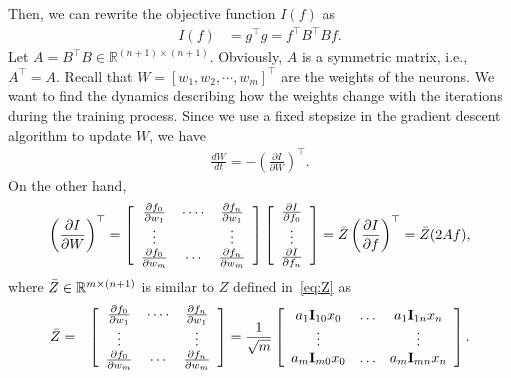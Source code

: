 \documentclass[letterpaper,12pt]{article}
\begin{document}
Then, we can rewrite the objective function $I(f)$ as 
\begin{equation}
\begin{aligned}
I(f) &=g^{\top} g  =f^{\top} B^{\top} B  f.
\end{aligned}
\end{equation}
Let $A=B^{\top}B \in \mathbb{R}^{(n+1) \times (n+1)} $. Obviously, $A$ is a symmetric matrix, i.e., $A^{\top}=A$. Recall that  $W=[w_{1},w_{2}, \cdots, w_{m}]^{\top}$ are the weights of the neurons. We want to find the dynamics describing how the weights change with the iterations during the training process. Since we use a fixed stepsize in the gradient descent algorithm to update $W$, we have 
\begin{eqnarray}
\frac{dW}{dt}
=-\left(\frac{\partial I}{\partial W}\right)^{\top}.
\end{eqnarray}
On the other hand, 
\begin{eqnarray}
    \left(\frac{\partial I}{\partial W}\right)^{\top}=\left[\begin{array}{ccc}
\frac{\partial f_{0}}{\partial w_{1}} & \cdots \cdot & \frac{\partial f_{n}}{\partial w_{1}} \\

\vdots&&\vdots\\
\frac{\partial f_{0}}{\partial w_{m}} & \cdots & \frac{\partial f_{n}}{\partial w_{m}}
\end{array}\right]\left[\begin{array}{c}
\frac{\partial I}{\partial f_{0}}  \\
\vdots\\
\frac{\partial I}{\partial f_{n}} 
\end{array}\right]=\Bar{Z}\left(\frac{\partial I}{\partial f}\right)^{\top}=\Bar{Z}(2Af),
\end{eqnarray}
where $\Bar{Z}\in {\mathbb R}^{m\times(n+1)}$ is similar to $Z$ defined in~\eqref{eq:Z} as
\begin{eqnarray}
\Bar{Z}&=&\left[\begin{array}{ccc}
\frac{\partial f_{0}}{\partial w_{1}} & \cdots \cdot & \frac{\partial f_{n}}{\partial w_{1}}\\
\vdots&&\vdots\\
\frac{\partial f_{0}}{\partial w_{m}} & \cdots & \frac{\partial f_{n}}{\partial w_{m}}
\end{array}\right]= \frac{1}{\sqrt{m}}\left[\begin{array}{ccc}
a_{1} \mathbf{I}_{10} {x}_{0}  & \ldots & a_{1} \mathbf{I}_{1 n}{x}_{n} \\
\vdots&&\vdots\\
a_{m} \mathbf{I}_{m0} {x}_{0}  & \ldots & a_{m} \mathbf{I}_{m n} {x}_{n}
\end{array}\right].
\end{eqnarray}
\end{document}
